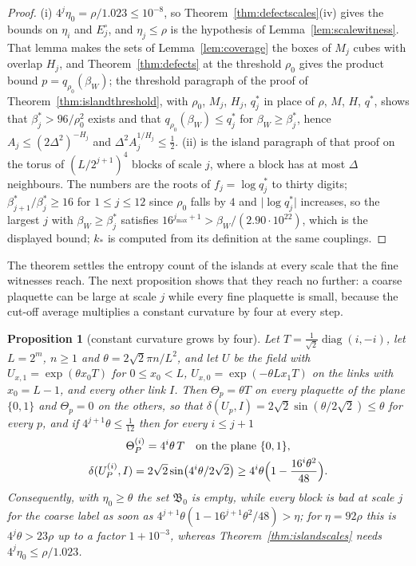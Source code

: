 \documentclass[11pt]{amsart}
\newtheorem{proposition}[theorem]{Proposition}
\theoremstyle{definition}
\theoremstyle{remark}
\numberwithin{equation}{section}
\begin{document}
\begin{proof}
(i) $4^j\eta_0=\rho/1.023\le10^{-8}$, so Theorem~\ref{thm:defectscales}(iv)
gives the bounds on $\eta_i$ and $E^\circ_j$, and $\eta_j\le\rho$ is the
hypothesis of Lemma~\ref{lem:scalewitness}. That lemma makes the sets of
Lemma~\ref{lem:coverage} the boxes of $M_j$ cubes with overlap $H_j$, and
Theorem~\ref{thm:defects} at the threshold $\rho_0$ gives the product bound
$p=q_{\rho_0}(\beta_W)$; the threshold paragraph of the proof of
Theorem~\ref{thm:islandthreshold}, with $\rho_0$, $M_j$, $H_j$, $q^*_j$ in
place of $\rho$, $M$, $H$, $q^*$, shows that $\beta^*_j>96/\rho_0^2$ exists
and that $q_{\rho_0}(\beta_W)\le q^*_j$ for $\beta_W\ge\beta^*_j$, hence
$A_j\le(2\varDelta^2)^{-H_j}$ and $\varDelta^2A_j^{1/H_j}\le\frac12$.
(ii) is the island paragraph of that proof on the torus of
$(L/2^{j+1})^4$ blocks of scale $j$, where a block has at most $\varDelta$
neighbours. The numbers are the roots of $f_j=\log q^*_j$ to thirty
digits; $\beta^*_{j+1}/\beta^*_j\ge16$ for $1\le j\le12$ since
$\rho_0$ falls by $4$ and $\lvert\log q^*_j\rvert$ increases, so the largest
$j$ with $\beta_W\ge\beta^*_j$ satisfies $16^{j_{\max}+1}>\beta_W/(2.90
\cdot10^{22})$, which is the displayed bound; $k_*$ is computed from its
definition at the same couplings.
\end{proof}

The theorem settles the entropy count of the islands at every scale that
the fine witnesses reach. The next proposition shows that they reach no
further: a coarse plaquette can be large at scale $j$ while every fine
plaquette is small, because the cut-off average multiplies a constant
curvature by four at every step.

\begin{proposition}[constant curvature grows by four]\label{prop:constantcurvature}
Let $T=\frac1{\sqrt2}\operatorname{diag}(i,-i)$, let $L=2^m$, $n\ge1$ and
$\theta=2\sqrt2\pi n/L^2$, and let $U$ be the field with $U_{x,1}=\exp(
\theta x_0T)$ for $0\le x_0<L$, $U_{x,0}=\exp(-\theta Lx_1T)$ on the links
with $x_0=L-1$, and every other link $I$. Then $\Theta_p=\theta T$ on every
plaquette of the plane $\{0,1\}$ and $\Theta_p=0$ on the others, so that
$\delta(U_p,I)=2\sqrt2\sin(\theta/2\sqrt2)\le\theta$ for every $p$, and if
$4^{j+1}\theta\le\frac1{12}$ then for every $i\le j+1$
\begin{gather*}
\Theta^{(i)}_P=4^i\theta\,T\quad\text{on the plane }\{0,1\},\\
\delta(U^{(i)}_P,I)=2\sqrt2\sin\bigl(4^i\theta/2\sqrt2\bigr)\ge4^i\theta
\Bigl(1-\frac{16^i\theta^2}{48}\Bigr).
\end{gather*}
Consequently, with $\eta_0\ge\theta$ the set $\mathfrak B_0$ is empty,
while every block is bad at scale $j$ for the coarse label as soon as
$4^{j+1}\theta(1-16^{j+1}\theta^2/48)>\eta$; for $\eta=92\rho$ this is
$4^j\theta>23\rho$ up to a factor $1+10^{-3}$, whereas
Theorem~\ref{thm:islandscales} needs $4^j\eta_0\le\rho/1.023$.
\end{proposition}
\end{document}
